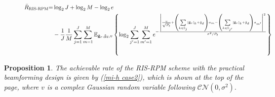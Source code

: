 \documentclass[draftclsnofoot,onecolumn,12pt]{IEEEtran}
\newtheorem{proposition}[theorem]{Proposition}
\begin{document}
\begin{figure}[!t]
	\begin{align}\label{mi-h case2}
	\bar{R}_\text{RIS-RPM}\hspace{-0.1cm}=&\log_2{J}+\log_2 M -\log_2e \notag\\
	&-\frac{1}{{J}}\frac{1}{M}\sum_{j=1}^{J}\sum_{m=1}^{M}\mathbb{E}_{\tilde{\bf g}_r,\tilde{ g}_d,v}\left\{\log_2 \sum_{j'=1}^{J}\sum_{m'=1}^{M} e^{-\frac{\left| \frac{v}{\sqrt{P_t}}+\left(\sum\limits_{k\in \mathbb{S}_j} \left[{\tilde{\bf g}}_r\right]_k + {\tilde{g}}_d\right)a_m-\left(\sum\limits_{k\in \mathbb{S}_{j'}} \left[{\tilde{\bf g}}_r\right]_k + {\tilde{g}}_d\right)a_{m'} \right|^2}{\sigma^2/P_t}} \right\}
	\end{align}
	\hrulefill
\end{figure}

\begin{proposition}
	The achievable rate of the RIS-RPM scheme with the practical beamforming design is given by (\ref{mi-h case2}), which is shown at the top of the page, where $v$ is a complex Gaussian random variable following $\mathcal{CN}( { 0},\sigma^2)$. 
\end{proposition}
\end{document}
